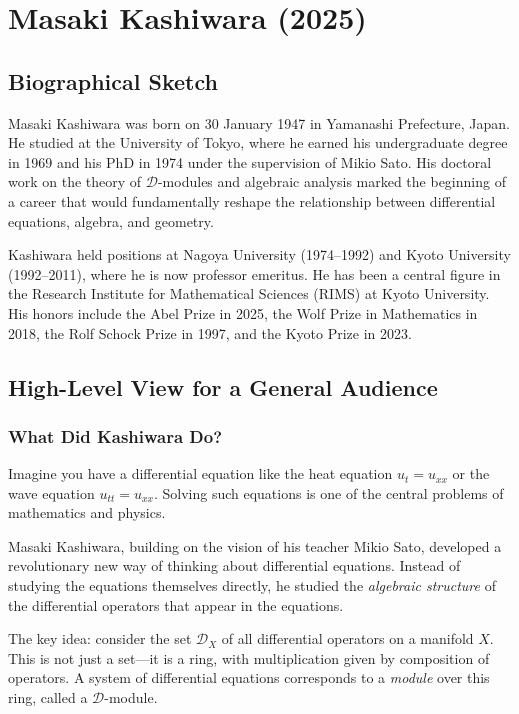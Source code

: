 \chapter{Masaki Kashiwara (2025)}

\section{Biographical Sketch}



Masaki Kashiwara was born on 30 January 1947 in Yamanashi Prefecture, Japan. He studied at the University of Tokyo, where he earned his undergraduate degree in 1969 and his PhD in 1974 under the supervision of Mikio Sato. His doctoral work on the theory of $\mathcal{D}$-modules and algebraic analysis marked the beginning of a career that would fundamentally reshape the relationship between differential equations, algebra, and geometry.

Kashiwara held positions at Nagoya University (1974--1992) and Kyoto University (1992--2011), where he is now professor emeritus. He has been a central figure in the Research Institute for Mathematical Sciences (RIMS) at Kyoto University. His honors include the Abel Prize in 2025, the Wolf Prize in Mathematics in 2018, the Rolf Schock Prize in 1997, and the Kyoto Prize in 2023.

\section{High-Level View for a General Audience}

\subsection{What Did Kashiwara Do?}

Imagine you have a differential equation like the heat equation $u_t = u_{xx}$ or the wave equation $u_{tt} = u_{xx}$. Solving such equations is one of the central problems of mathematics and physics.

Masaki Kashiwara, building on the vision of his teacher Mikio Sato, developed a revolutionary new way of thinking about differential equations. Instead of studying the equations themselves directly, he studied the \emph{algebraic structure} of the differential operators that appear in the equations.

The key idea: consider the set $\mathcal{D}_X$ of all differential operators on a manifold $X$. This is not just a set---it is a ring, with multiplication given by composition of operators. A system of differential equations corresponds to a \emph{module} over this ring, called a $\mathcal{D}$-module.

